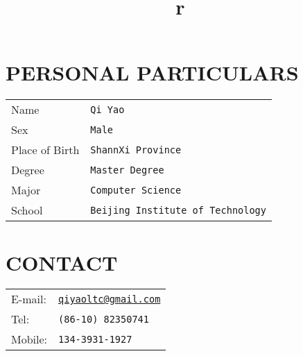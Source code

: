 \begin{resume}

\section{\textsc{PERSONAL PARTICULARS}}
\begin{tabular}{l l}
Name & \texttt{Qi Yao} \\
Sex & \texttt{Male} \\
Place of Birth & \texttt{ShannXi Province} \\
Degree & \texttt{Master Degree} \\
Major & \texttt{Computer Science} \\
School & \texttt{Beijing Institute of Technology} \\
\end{tabular}
\section{\textsc{CONTACT}}
\begin{tabular}{l l}
E-mail: & \href{qiyaoltc@gmail.com}{\texttt{qiyaoltc@gmail.com}} \\
Tel: & \texttt{(86-10) 82350741} \\
Mobile: & \texttt{134-3931-1927} \\
\end{tabular}

\begin{format}
  \title{r}\\
  \\
  \body\\
\end{format}


\end{resume}
